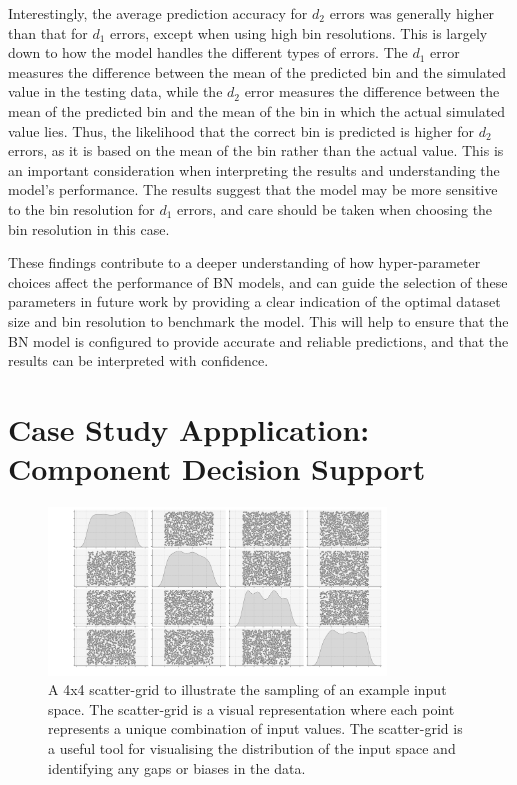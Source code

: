 \documentclass[journal]{IEEEtran}
\begin{document}
Interestingly, the average prediction accuracy for $d_{2}$ errors was generally higher than that for $d_{1}$ errors, except when using high bin resolutions. This is largely down to how the model handles the different types of errors. The $d_{1}$ error measures the difference between the mean of the predicted bin and the simulated value in the testing data, while the $d_{2}$ error measures the difference between the mean of the predicted bin and the mean of the bin in which the actual simulated value lies. Thus, the likelihood that the correct bin is predicted is higher for $d_{2}$ errors, as it is based on the mean of the bin rather than the actual value. This is an important consideration when interpreting the results and understanding the model's performance. The results suggest that the model may be more sensitive to the bin resolution for $d_{1}$ errors, and care should be taken when choosing the bin resolution in this case.

These findings contribute to a deeper understanding of how hyper-parameter choices affect the performance of BN models, and can guide the selection of these parameters in future work by providing a clear indication of the optimal dataset size and bin resolution to benchmark the model. This will help to ensure that the BN model is configured to provide accurate and reliable predictions, and that the results can be interpreted with confidence.

\section{Case Study Appplication: Component Decision Support}\label{sec:res_decision} 

\begin{figure}[t]
    \centering
    \includegraphics[width=0.8\textwidth]{figures/4grid_scatter.png}
    \caption{\small A 4x4 scatter-grid to illustrate the sampling of an example input space. The scatter-grid is a visual representation where each point represents a unique combination of input values. The scatter-grid is a useful tool for visualising the distribution of the input space and identifying any gaps or biases in the data.}\label{fig:scatter_sampling}
\end{figure}
\end{document}
